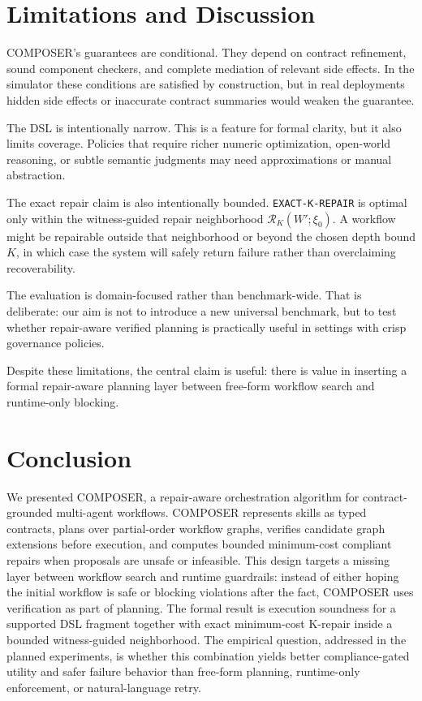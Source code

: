 \documentclass[11pt]{article}
\begin{document}
\section{Limitations and Discussion}
COMPOSER's guarantees are conditional. They depend on contract refinement, sound component checkers, and complete mediation of relevant side effects. In the simulator these conditions are satisfied by construction, but in real deployments hidden side effects or inaccurate contract summaries would weaken the guarantee.

The DSL is intentionally narrow. This is a feature for formal clarity, but it also limits coverage. Policies that require richer numeric optimization, open-world reasoning, or subtle semantic judgments may need approximations or manual abstraction.

The exact repair claim is also intentionally bounded. \texttt{EXACT-K-REPAIR} is optimal only within the witness-guided repair neighborhood $\mathcal{R}_K(W';\xi_0)$. A workflow might be repairable outside that neighborhood or beyond the chosen depth bound $K$, in which case the system will safely return failure rather than overclaiming recoverability.

The evaluation is domain-focused rather than benchmark-wide. That is deliberate: our aim is not to introduce a new universal benchmark, but to test whether repair-aware verified planning is practically useful in settings with crisp governance policies.

Despite these limitations, the central claim is useful: there is value in inserting a formal repair-aware planning layer between free-form workflow search and runtime-only blocking.

\section{Conclusion}
We presented COMPOSER, a repair-aware orchestration algorithm for contract-grounded multi-agent workflows. COMPOSER represents skills as typed contracts, plans over partial-order workflow graphs, verifies candidate graph extensions before execution, and computes bounded minimum-cost compliant repairs when proposals are unsafe or infeasible. This design targets a missing layer between workflow search and runtime guardrails: instead of either hoping the initial workflow is safe or blocking violations after the fact, COMPOSER uses verification as part of planning. The formal result is execution soundness for a supported DSL fragment together with exact minimum-cost K-repair inside a bounded witness-guided neighborhood. The empirical question, addressed in the planned experiments, is whether this combination yields better compliance-gated utility and safer failure behavior than free-form planning, runtime-only enforcement, or natural-language retry.



\end{document}

